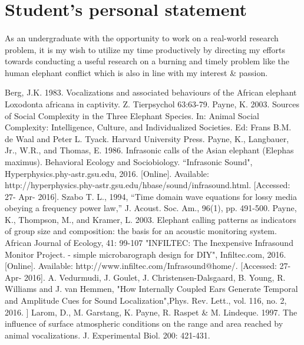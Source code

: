 \documentclass[11pt]{article}
\numberwithin{figure}{section}
\numberwithin{table}{section}
\begin{document}
\section{Student's personal statement}

\paragraph{}
As an undergraduate with the opportunity to work on a real-world research problem, it is my wish to utilize my time productively by directing my efforts towards conducting a useful research on a burning and timely problem like the human elephant conflict which is also in line with my interest \& passion.

\newpage
\begin{thebibliography}{1}
 Berg, J.K. 1983. Vocalizations and associated behaviours of the African elephant Loxodonta africana in captivity. Z. Tierpsychol 63:63-79.
Payne, K. 2003. Sources of Social Complexity in the Three Elephant Species. In: Animal Social Complexity: Intelligence, Culture, and Individualized Societies. Ed: Frans B.M. de Waal and Peter L. Tyack. Harvard University Press.
 Payne, K., Langbauer, Jr., W.R., and Thomas, E. 1986. Infrasonic calls of the Asian elephant (Elephas maximus). Behavioral Ecology and Sociobiology.
 “Infrasonic Sound", Hyperphysics.phy-astr.gsu.edu, 2016. [Online]. Available: http://hyperphysics.phy-astr.gsu.edu/hbase/sound/infrasound.html. [Accessed: 27- Apr- 2016].
 Szabo T. L., 1994, “Time domain wave equations for lossy media obeying a frequency power law,” J. Acoust. Soc. Am., 96(1), pp. 491-500.
 Payne, K., Thompson, M., and Kramer, L. 2003. Elephant calling patterns as indicators of group size and composition: the basis for an acoustic monitoring system. African Journal of Ecology, 41: 99-107
 "INFILTEC: The Inexpensive Infrasound Monitor Project. - simple microbarograph design for DIY", Infiltec.com, 2016. [Online]. Available: http://www.infiltec.com/Infrasound@home/. [Accessed: 27- Apr- 2016].
 A. Vedurmudi, J. Goulet, J. Christensen-Dalsgaard, B. Young, R. Williams and J. van Hemmen, "How Internally Coupled Ears Generate Temporal and Amplitude Cues for Sound Localization",Phys. Rev. Lett., vol. 116, no. 2, 2016.
 ] Larom, D., M. Garstang, K. Payne, R. Raspet \& M. Lindeque. 1997. The influence of surface atmospheric conditions on the range and area reached by animal vocalizations. J. Experimental Biol. 200: 421-431.

\end{thebibliography}
\end{document}
